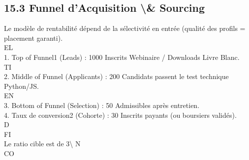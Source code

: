 \subsection{15.3 Funnel d’Acquisition \textbackslash{}& Sourcing}
Le modèle de rentabilité dépend de la sélectivité en entrée (qualité des profils = placement garanti).\\
\vspace{0.5em}
\vspace{0.5em}
\vspace{0.5em}
\vspace{0.5em}
EL\\
1. Top of Funnel1 (Leads) : 1000 Inscrits Webinaire / Downloads Livre Blanc.\\
\vspace{0.5em}
\vspace{0.5em}
\vspace{0.5em}
\vspace{0.5em}
TI\\
2. Middle of Funnel (Applicants) : 200 Candidats passent le test technique Python/JS.\\
\vspace{0.5em}
\vspace{0.5em}
\vspace{0.5em}
\vspace{0.5em}
EN\\
3. Bottom of Funnel (Selection) : 50 Admissibles après entretien.\\
\vspace{0.5em}
4. Taux de conversion2 (Cohorte) : 30 Inscrits payants (ou boursiers validés).\\
\vspace{0.5em}
\vspace{0.5em}
\vspace{0.5em}
\vspace{0.5em}
D\\
FI\\
Le ratio cible est de 3\textbackslash{}%
\vspace{0.5em}
N\\
CO\\
